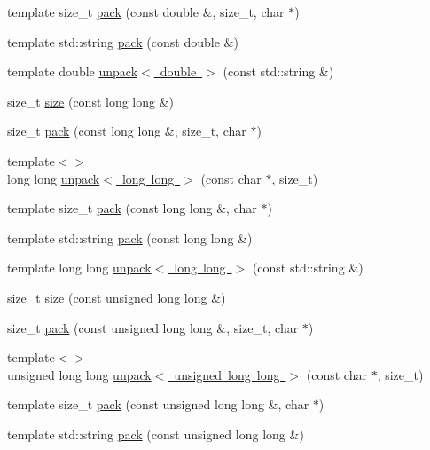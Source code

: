 \begin{DoxyCompactItemize}
\item 
template size\+\_\+t \mbox{\hyperlink{namespaceebml_a027af75ad19fec2ebab68496ee378985}{pack}} (const double \&, size\+\_\+t, char $\ast$)
\item 
template std\+::string \mbox{\hyperlink{namespaceebml_a71bb6ebad794abe2b04f2d24036636cd}{pack}} (const double \&)
\item 
template double \mbox{\hyperlink{namespaceebml_af6f7324527703d090d8518b49776033a}{unpack$<$ double $>$}} (const std\+::string \&)
\item 
size\+\_\+t \mbox{\hyperlink{namespaceebml_a54b33809097f683fb8345f9668e8237b}{size}} (const long long \&)
\item 
size\+\_\+t \mbox{\hyperlink{namespaceebml_ae32979c8cc295384d62cd00e9a256059}{pack}} (const long long \&, size\+\_\+t, char $\ast$)
\item 
{\footnotesize template$<$$>$ }\\long long \mbox{\hyperlink{namespaceebml_abb67ef3f7f8a4e21d3aa99d928dd715c}{unpack$<$ long long $>$}} (const char $\ast$, size\+\_\+t)
\item 
template size\+\_\+t \mbox{\hyperlink{namespaceebml_ac35ff5c48449c99a03dced64fdad8d9e}{pack}} (const long long \&, char $\ast$)
\item 
template std\+::string \mbox{\hyperlink{namespaceebml_a1c119d830a8a0d4f83e1362ade4c84ba}{pack}} (const long long \&)
\item 
template long long \mbox{\hyperlink{namespaceebml_aee739b2993a6e10f162ee2346d77d17c}{unpack$<$ long long $>$}} (const std\+::string \&)
\item 
size\+\_\+t \mbox{\hyperlink{namespaceebml_a6e2cf9e4800e8a09b5f4cb8de613ad77}{size}} (const unsigned long long \&)
\item 
size\+\_\+t \mbox{\hyperlink{namespaceebml_a71a18263f24d4160b1c97d74273745c7}{pack}} (const unsigned long long \&, size\+\_\+t, char $\ast$)
\item 
{\footnotesize template$<$$>$ }\\unsigned long long \mbox{\hyperlink{namespaceebml_a9631ff473950f82b6cb6302b2126d277}{unpack$<$ unsigned long long $>$}} (const char $\ast$, size\+\_\+t)
\item 
template size\+\_\+t \mbox{\hyperlink{namespaceebml_aefd18e43ba3909d196ab0bfa6d4ab640}{pack}} (const unsigned long long \&, char $\ast$)
\item 
template std\+::string \mbox{\hyperlink{namespaceebml_a4792d18415e00b078131b9590e832b9b}{pack}} (const unsigned long long \&)

\end{DoxyCompactItemize}
